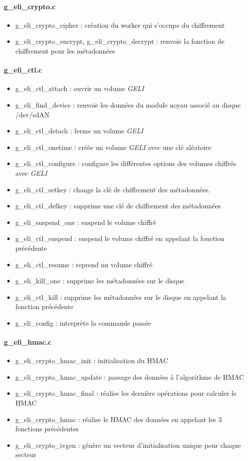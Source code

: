 \paragraph{g\_eli\_crypto.c}
\begin{itemize}
	\item g\_eli\_crypto\_cipher : création du worker qui s'occupe du 
		chiffrement
	\item g\_eli\_crypto\_encrypt, g\_eli\_crypto\_decrypt : 
		renvoie la fonction de chiffrement pour les métadonnées
\end{itemize}

\paragraph{g\_eli\_ctl.c}
\begin{itemize}
	\item g\_eli\_ctl\_attach : ouvrir un volume {\em GELI}
	\item g\_eli\_find\_device : renvoie les données du module noyau 
		associé au disque /dev/sdAN
	\item g\_eli\_ctl\_detach : ferme un volume {\em GELI}
	\item g\_eli\_ctl\_onetime : créée un volume {\em GELI} avec une clé
		aléatoire
	\item g\_eli\_ctl\_configure : configure les différentes options des
		volumes chiffrés avec {\em GELI}
	\item g\_eli\_ctl\_setkey : change la clé de chiffrement des 
		métadonnées.
	\item g\_eli\_ctl\_delkey : supprime une clé de chiffrement des 
		métadonnées
	\item g\_eli\_suspend\_one : suspend le volume chiffré
	\item g\_eli\_ctl\_suspend : suspend le volume chiffré en appelant la 
		fonction précédente
	\item g\_eli\_ctl\_resume : reprend un volume chiffré
	\item g\_eli\_kill\_one : supprime les métadonnées sur le disque
	\item g\_eli\_ctl\_kill : supprime les métadonnées sur le disque en 
		appelant la fonction précédente
	\item g\_eli\_config : interprète la commande passée
\end{itemize}
\paragraph{g\_eli\_hmac.c}
\begin{itemize}
	\item g\_eli\_crypto\_hmac\_init : initialisation du HMAC
	\item g\_eli\_crypto\_hmac\_update : passage des données à l'algorithme
		de HMAC
	\item g\_eli\_crypto\_hmac\_final : réalise les dernière opérations 
		pour calculer le HMAC
	\item g\_eli\_crypto\_hmac : réalise le HMAC des données en appelant 
		les 3 fonctions précédentes
	\item g\_eli\_crypto\_ivgen : génère un vecteur d'initialisation unique
		pour chaque secteur
\end{itemize}

